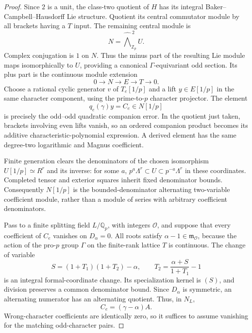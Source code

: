 \documentclass[11pt]{article}
\theoremstyle{definition}
\numberwithin{equation}{section}
\begin{document}
\begin{proof}
Since $2$ is a unit, the class-two quotient of $H$ has its integral
Baker--Campbell--Hausdorff Lie structure. Quotient its central
commutator module by all brackets having a $T$ input. The remaining
central module is
\begin{equation}
 N=\widehat{\bigwedge}^{\,2}_{\mathbb Z_p}U.
\end{equation}
Complex conjugation is $1$ on $N$. Thus the minus part of the
resulting Lie module maps isomorphically to $U$, providing a
canonical $\Gamma$-equivariant odd section. Its plus part is the
continuous module extension
\begin{equation}
 0\longrightarrow N\longrightarrow E\longrightarrow T
 \longrightarrow0.                                          \label{eq:ce2}
\end{equation}
Choose a rational cyclic generator $v$ of $T_e[1/p]$ and a lift
$y\in E[1/p]$ in the same character component, using the
prime-to-$p$ character projector. The element
\begin{equation}
 q_e(\gamma)y=C_e\in N[1/p]                                 \label{eq:ce3}
\end{equation}
is precisely the odd--odd quadratic companion error. In the quotient
just taken, brackets involving even lifts vanish, so an ordered
companion product becomes its additive characteristic-polynomial
expression. A derived element has the same degree-two logarithmic
and Magnus coefficient.

Finite generation clears the denominators of the chosen isomorphism
$U[1/p]\simeq R^r$ and its inverse: for some $a$,
$p^a\Lambda^r\subset U\subset p^{-a}\Lambda^r$ in these
coordinates. Completed tensor and exterior squares inherit fixed
denominator bounds. Consequently $N[1/p]$ is the bounded-denominator
alternating two-variable coefficient module, rather than a module of
series with arbitrary coefficient denominators.

Pass to a finite splitting field $L/\mathbb Q_p$, with integers
$\mathcal O$, and suppose that every coefficient of $C_e$ vanishes
on $D_\alpha=0$. All roots satisfy $\alpha-1\in\mathfrak m_{\mathcal O}$,
because the action of the pro-$p$ group $\Gamma$ on the finite-rank
lattice $T$ is continuous. The change of variable
\begin{equation}
 S=(1+T_1)(1+T_2)-\alpha,\qquad
 T_2=\frac{\alpha+S}{1+T_1}-1
\end{equation}
is an integral formal-coordinate change. Its specialization kernel
is $(S)$, and division preserves a common denominator bound.
Since $D_\alpha$ is symmetric, an alternating numerator has an
alternating quotient. Thus, in $N_L$,
\begin{equation}
 C_e=(\gamma-\alpha)A.                                      \label{eq:ce4}
\end{equation}
Wrong-character coefficients are identically zero, so it suffices
to assume vanishing for the matching odd-character pairs.


\end{proof}
\end{document}
